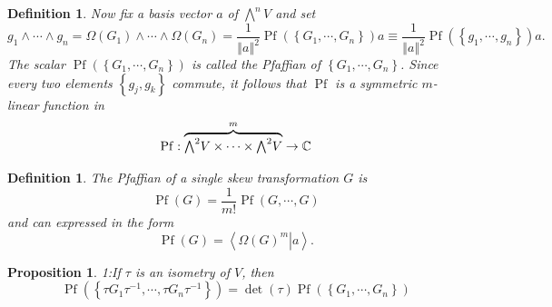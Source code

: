 \documentclass[aps,preprint]{revtex4}%
\newtheorem{definition}[theorem]{Definition}
\newtheorem{proposition}[theorem]{Proposition}
\begin{document}
\begin{definition}
Now fix a basis vector $a$ of $%
{\textstyle\bigwedge\nolimits^{n}}
V$ and set
\begin{equation}
g_{1}\wedge\cdots\wedge g_{n}=\Omega\left(  G_{1}\right)  \wedge\cdots
\wedge\Omega\left(  G_{n}\right)  =\frac{1}{\left\Vert a\right\Vert ^{2}%
}\operatorname{Pf}\left(  \left\{  G_{1},\cdots,G_{n}\right\}  \right)
a\equiv\frac{1}{\left\Vert a\right\Vert ^{2}}\operatorname{Pf}\left(  \left\{
g_{1},\cdots,g_{n}\right\}  \right)  a.
\end{equation}
The scalar $\operatorname{Pf}\left(  \left\{  G_{1},\cdots,G_{n}\right\}
\right)  $ is called the Pfaffian of $\left\{  G_{1},\cdots,G_{n}\right\}  $.
Since every two elements $\left\{  g_{j},g_{k}\right\}  $ commute, it follows
that $\operatorname{Pf}$ is a \emph{symmetric} $m$-linear function in
\begin{equation}
\operatorname{Pf}:\overset{m}{\overbrace{%
{\textstyle\bigwedge\nolimits^{2}}
V\times\cdots\times%
{\textstyle\bigwedge\nolimits^{2}}
V}}\rightarrow\mathbb{C}%
\end{equation}

\end{definition}

\begin{definition}
The Pfaffian of a single skew transformation $G$ is
\begin{equation}
\operatorname{Pf}\left(  G\right)  =\frac{1}{m!}\operatorname{Pf}\left(
G,\cdots,G\right)
\end{equation}
and can expressed in the form
\begin{equation}
\operatorname{Pf}\left(  G\right)  =\left\langle \left.  \Omega\left(
G\right)  ^{m}\right\vert a\right\rangle .
\end{equation}

\end{definition}

\begin{proposition}
1:If $\mathfrak{\tau}$ is an isometry of $V$, then
\begin{equation}
\operatorname{Pf}\left(  \left\{  \mathfrak{\tau}G_{1}\mathfrak{\tau}%
^{-1},\cdots,\mathfrak{\tau}G_{n}\mathfrak{\tau}^{-1}\right\}  \right)
=\det\left(  \mathfrak{\tau}\right)  \operatorname{Pf}\left(  \left\{
G_{1},\cdots,G_{n}\right\}  \right)
\end{equation}

\end{proposition}
\end{document}
